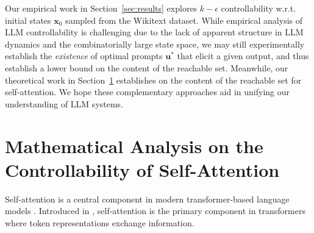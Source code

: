 \documentclass{article} %
\begin{document}
Our empirical work in Section~\ref{sec:results} explores $k-\epsilon$ controllability w.r.t. initial states $\mathbf x_0$ sampled from the Wikitext dataset. 
While empirical analysis of LLM controllability is challenging due to the lack of apparent structure in LLM dynamics and the combinatorially large state space, we may still experimentally establish the \textit{existence} of optimal prompts $\mathbf u^*$ that elicit a given output, and thus establish a lower bound on the content of the reachable set. 
Meanwhile, our theoretical work in Section~\ref{sec:single_head} establishes  on the content of the reachable set for self-attention. 
We hope these complementary approaches aid in unifying our understanding of LLM systems. 







\section{Mathematical Analysis on the Controllability of Self-Attention}
\label{sec:single_head}

Self-attention is a central component in modern transformer-based language models \citep{gpt3, llama_1, radford2019language, min2023recent}. Introduced in \cite{vaswani2017attention}, self-attention is the primary component in transformers where token representations exchange information. 
\end{document}
